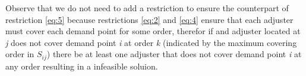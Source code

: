 %

Observe that
we do not need
to add a restriction
to ensure
the counterpart of restriction \ref{eq:5}
because restrictions \ref{eq:2} and \ref{eq:4}
ensure that
each adjuster
must cover each demand point
for some order,
therefor
if and adjuster located at \textit{j}
does not cover demand point \textit{i}
at order \textit{k}
(indicated by
the maximum covering order in $S_{ij}$)
there be at least
one adjuster
that does not cover
demand point \textit{i}
at any order
resulting in a infeasible soluion.

